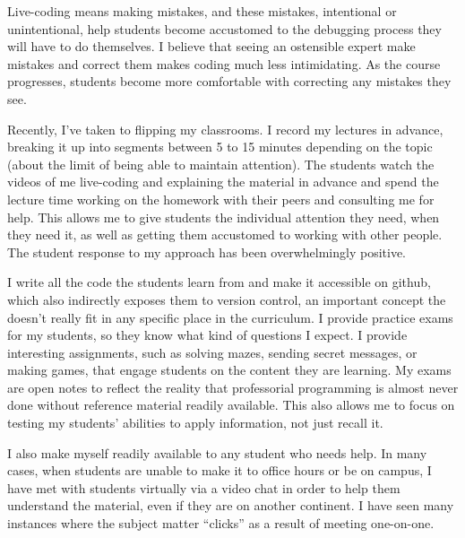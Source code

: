 \documentclass[a4paper]{article}
\begin{document}
Live-coding means making mistakes, and these mistakes, intentional or unintentional, help students become accustomed to the debugging process they will have to do themselves.
I believe that seeing an ostensible expert make mistakes and correct them makes coding much less intimidating.
As the course progresses, students become more comfortable with correcting any mistakes they see.

Recently, I've taken to flipping my classrooms.
I record my lectures in advance, breaking it up into segments between 5 to 15 minutes depending on the topic (about the limit of being able to maintain attention).
The students watch the videos of me live-coding and explaining the material in advance and spend the lecture time working on the homework with their peers and consulting me for help.
This allows me to give students the individual attention they need, when they need it, as well as getting them accustomed to working with other people.
The student response to my approach has been overwhelmingly positive.

I write all the code the students learn from and make it accessible on github, which also indirectly exposes them to version control, an important concept the doesn't really fit in any specific place in the curriculum. 
I provide practice exams for my students, so they know what kind of questions I expect.
I provide interesting assignments, such as solving mazes, sending secret messages, or making games, that engage students on the content they are learning.
My exams are open notes to reflect the reality that professorial programming is almost never done without reference material readily available.
This also allows me to focus on testing my students' abilities to apply information, not just recall it.

I also make myself readily available to any student who needs help.
In many cases, when students are unable to make it to office hours or be on campus, I have met with students virtually via a video chat in order to help them understand the material, even if they are on another continent.
I have seen many instances where the subject matter ``clicks'' as a result of meeting one-on-one.

%
\end{document}
